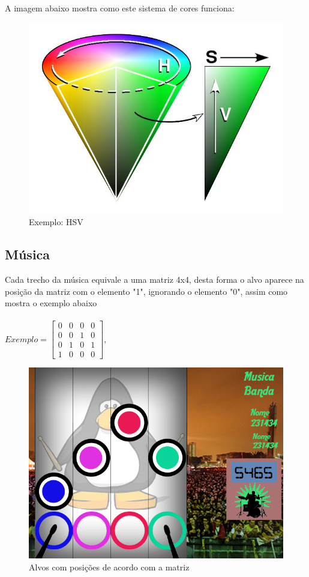 \documentclass{sciposter}
\begin{document}
\begin{multicols}{3}
A imagem abaixo mostra como este sistema de cores funciona:

\begin{figure}[!htb]
\centering
\includegraphics[scale=0.6]{HSV_cone.jpg}
\caption{Exemplo: HSV}
\end{figure}

\subsection{Música}

Cada trecho da música equivale a uma matriz 4x4, desta forma o alvo aparece na posição da matriz com o elemento "1", ignorando o elemento "0", assim como mostra o exemplo abaixo
\\
\\

$ Exemplo =\left[\begin{array}{rrrr}
0 & 0 & 0 & 0\\
0 & 0 & 1 & 0\\
0 & 1 & 0 & 1\\
1 & 0 & 0 & 0
\end{array}\right],\quad$

\begin{figure}[!htb]
\centering
\includegraphics[width=20cm]{Exemple.png}
\caption{Alvos com posições de acordo com a matriz}
\label{alvos}
\end{figure}


\end{multicols}
\end{document}
